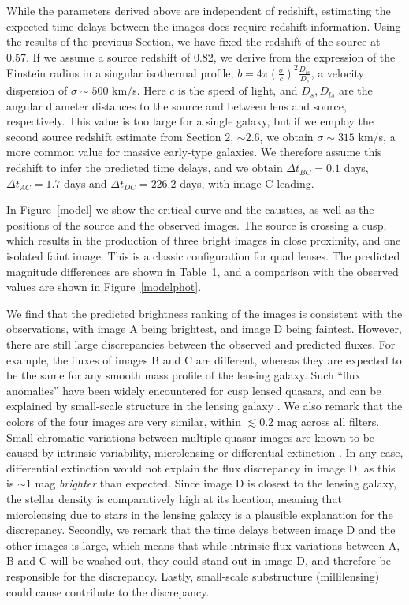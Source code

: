 \documentclass[manuscript]{aastex}
\begin{document}
While the parameters derived above are independent of redshift, estimating the expected time delays between the images does require redshift information. Using the results of the previous Section, we have fixed the redshift of the source at 0.57. If we assume a source redshift of 0.82, we derive from the expression of the Einstein radius in a singular isothermal profile, $b=4\pi\left(\frac{\sigma}{c}\right)^2\frac{D_{ls}}{D_{s}}$, a velocity dispersion of $\sigma\sim500$ km/s. Here $c$ is the speed of light, and $D_{s},D_{ls}$ are the angular diameter distances to the source and between lens and source, respectively. This value is too large for a single galaxy, but if we employ the second source redshift estimate from Section 2, $\sim2.6$, we obtain $\sigma\sim315$ km/s, a more common value for massive early-type galaxies. We therefore assume this redshift to infer the predicted time delays, and we obtain $\Delta t_{BC} = 0.1$ days, $\Delta t_{AC} = 1.7$ days and $\Delta t_{DC} = 226.2$ days, with image C leading.   

In Figure~\ref{model} we show the critical curve and the caustics, as well as the positions of the source and the observed images. The source is crossing a cusp, which results in the production of three bright images in close proximity, and one isolated faint image. This is a classic configuration for quad lenses. The predicted magnitude differences are shown in Table~1, and a comparison with the observed values are shown in Figure~\ref{modelphot}. 

We find that the predicted brightness ranking of the images is consistent with the observations, with image A being brightest, and image D being faintest. However, there are still large discrepancies between the observed and predicted fluxes. For example, the fluxes of images B and C are different, whereas they are expected to be the same for any smooth mass profile of the lensing galaxy. Such ``flux anomalies'' have been widely encountered for cusp lensed quasars, and can be explained by small-scale structure in the lensing galaxy \citep[e.g.,][]{kee03}. We also remark that the colors of the four images are very similar, within $\lesssim 0.2$ mag across all filters. Small chromatic variations between multiple quasar images are known to be caused by intrinsic variability, microlensing or differential extinction \citep{yon08}. In any case, differential extinction would not explain the flux discrepancy in image D, as this is $\sim1$ mag \emph{brighter} than expected. Since image D is closest to the lensing galaxy, the stellar density is comparatively high at its location, meaning that microlensing due to stars in the lensing galaxy is a plausible explanation for the discrepancy. Secondly, we remark that the time delays between image D and the other images is large, which means that while intrinsic flux variations between A, B and C will be washed out, they could stand out in image D, and therefore be responsible for the discrepancy. Lastly, small-scale substructure (millilensing) could cause contribute to the discrepancy.
\end{document}
